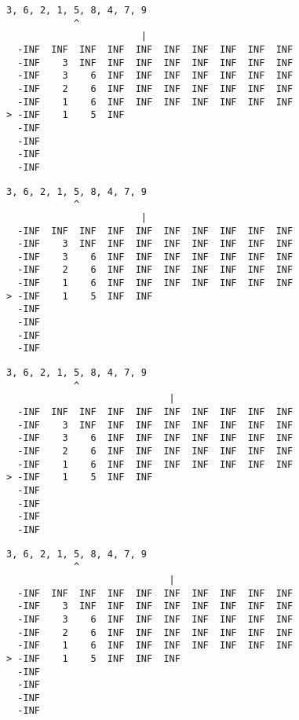 { \begin{verbatim}
3, 6, 2, 1, 5, 8, 4, 7, 9
            ^
                        |
  -INF  INF  INF  INF  INF  INF  INF  INF  INF  INF
  -INF    3  INF  INF  INF  INF  INF  INF  INF  INF
  -INF    3    6  INF  INF  INF  INF  INF  INF  INF
  -INF    2    6  INF  INF  INF  INF  INF  INF  INF
  -INF    1    6  INF  INF  INF  INF  INF  INF  INF
> -INF    1    5  INF                              
  -INF                                             
  -INF                                             
  -INF                                             
  -INF                                             
\end{verbatim} }

{ \begin{verbatim}
3, 6, 2, 1, 5, 8, 4, 7, 9
            ^
                        |
  -INF  INF  INF  INF  INF  INF  INF  INF  INF  INF
  -INF    3  INF  INF  INF  INF  INF  INF  INF  INF
  -INF    3    6  INF  INF  INF  INF  INF  INF  INF
  -INF    2    6  INF  INF  INF  INF  INF  INF  INF
  -INF    1    6  INF  INF  INF  INF  INF  INF  INF
> -INF    1    5  INF  INF                         
  -INF                                             
  -INF                                             
  -INF                                             
  -INF                                             
\end{verbatim} }

{ \begin{verbatim}
3, 6, 2, 1, 5, 8, 4, 7, 9
            ^
                             |
  -INF  INF  INF  INF  INF  INF  INF  INF  INF  INF
  -INF    3  INF  INF  INF  INF  INF  INF  INF  INF
  -INF    3    6  INF  INF  INF  INF  INF  INF  INF
  -INF    2    6  INF  INF  INF  INF  INF  INF  INF
  -INF    1    6  INF  INF  INF  INF  INF  INF  INF
> -INF    1    5  INF  INF                         
  -INF                                             
  -INF                                             
  -INF                                             
  -INF                                             
\end{verbatim} }

{ \begin{verbatim}
3, 6, 2, 1, 5, 8, 4, 7, 9
            ^
                             |
  -INF  INF  INF  INF  INF  INF  INF  INF  INF  INF
  -INF    3  INF  INF  INF  INF  INF  INF  INF  INF
  -INF    3    6  INF  INF  INF  INF  INF  INF  INF
  -INF    2    6  INF  INF  INF  INF  INF  INF  INF
  -INF    1    6  INF  INF  INF  INF  INF  INF  INF
> -INF    1    5  INF  INF  INF                    
  -INF                                             
  -INF                                             
  -INF                                             
  -INF                                             
\end{verbatim} }

